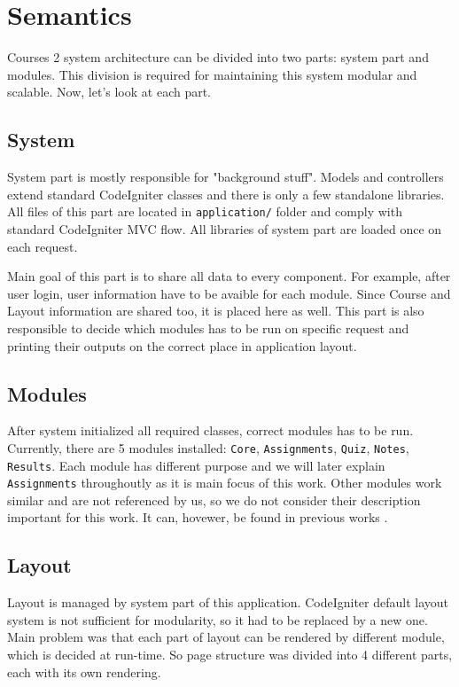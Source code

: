 \section{Semantics}

Courses 2 system architecture can be divided into two parts: system part and modules. This division is required for maintaining this system modular and scalable. Now, let's look at each part.

\subsection{System}

System part is mostly responsible for "background stuff". Models and controllers extend standard CodeIgniter classes and there is only a few standalone libraries. All files of this part are located in \texttt{application/} folder and comply with standard CodeIgniter MVC flow. All libraries of system part are loaded once on each request.


Main goal of this part is to share all data to every component. For example, after user login, user information have to be avaible for each module. Since Course and Layout information are shared too, it is placed here as well. This part is also responsible to decide which modules has to be run on specific request and printing their outputs on the correct place in application layout.

\subsection{Modules}

After system initialized all required classes, correct modules has to be run. Currently, there are 5 modules installed: \texttt{Core}, \texttt{Assignments}, \texttt{Quiz}, \texttt{Notes}, \texttt{Results}. Each module has different purpose and we will later explain \texttt{Assignments} throughoutly as it is main focus of this work. Other modules work similar and are not referenced by us, so we do not consider their description important for this work. It can, hovewer, be found in previous works \cite{culik}.

\subsection{Layout}

Layout is managed by system part of this application. CodeIgniter default layout system is not sufficient for modularity, so it had to be replaced by a new one. Main problem was that each part of layout can be rendered by different module, which is decided at run-time. So page structure was divided into 4 different parts, each with its own rendering.


